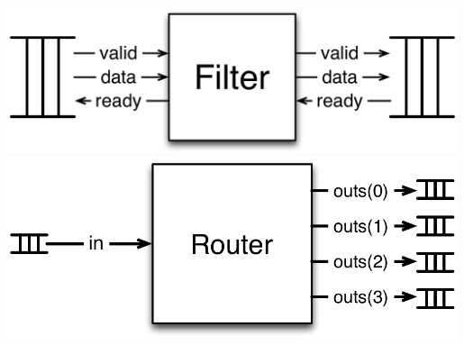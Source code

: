 \documentclass[xcolor=pdflatex,dvipsnames,table]{beamer}
\begin{document}
\begin{frame}[fragile]
\begin{columns}
\includegraphics[width=0.99\textwidth]{figs/filter.pdf} \\[20mm]
\includegraphics[width=0.99\textwidth]{figs/router.pdf} 

\end{columns}

\end{frame}
\end{document}
